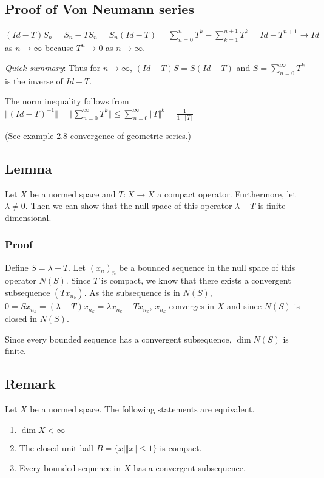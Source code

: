 \documentclass[11pt]{article}
\begin{document}
\subsection{Proof of Von Neumann series}
\label{sec:org21a2197}
\((Id - T)S_n =S_n - TS_n = S_n(Id - T) = \sum_{n=0}^{n} T^k -\sum_{k =
   1}^{n+1} T^k = Id - T^{n+1} \rightarrow Id\) as \(n \rightarrow \infty\) because
\(T^n \rightarrow 0\) as \(n \rightarrow \infty\).

\emph{Quick summary}: Thus for \(n \rightarrow \infty\), \((Id - T)S = S(Id - T)\) and
\(S = \sum_{n=0}^{\infty} T^k\) is the inverse of \(Id - T\).

The norm inequality follows from \(\Vert (Id - T)^{-1}\Vert = \Vert
   \sum_{n=0}^{\infty} T^k \Vert \le \sum_{n=0}^{\infty} \Vert T \Vert^k =
   \frac{1}{1 - \Vert T\Vert}\)

(See example 2.8 convergence of geometric series.)
\subsection{Lemma}
\label{sec:org4df2d24}
Let \(X\) be a normed space and \(T\colon X \rightarrow X\) a compact operator.
Furthermore, let \(\lambda \neq 0\). Then we can show that the null space of
this operator \(\lambda - T\) is finite dimensional.
\subsubsection{Proof}
\label{sec:orge8e5793}
Define \(S = \lambda - T\). Let \((x_n)_n\) be a bounded sequence in the null
space of this operator \(N(S)\). Since \(T\) is compact, we know that there
exists a convergent subsequence \((Tx_{n_k})\). As the subsequence is in
\(N(S)\), \(0 = Sx_{n_k} = (\lambda - T)x_{n_k} = \lambda x_{n_k} - T x_{n_k}\),
\(x_{n_k}\) converges in \(X\) and since \(N(S)\) is closed in \(N(S)\).

Since every bounded sequence has a convergent subsequence, \(\dim N(S)\) is
finite.
\subsection{Remark}
\label{sec:org32e96a3}
Let \(X\) be a normed space. The following statements are equivalent.
\begin{enumerate}
\item \(\dim X < \infty\)
\item The closed unit ball \(B = \{x \vert \Vert x \Vert \le 1\}\) is compact.
\item Every bounded sequence in \(X\) has a convergent subsequence.
\end{enumerate}
\end{document}
